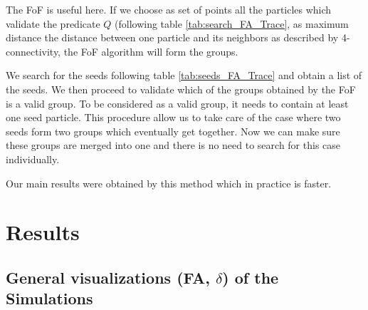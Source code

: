 \documentclass[12pt]{article}
\begin{document}
\begin{par}
The FoF is useful here. If we choose as set of points all the
particles which validate the predicate $Q$ (following table
\ref{tab:search_FA_Trace}, as maximum distance the distance
between one particle and its neighbors as described by
4-connectivity, the FoF algorithm will form the groups. 
\end{par}
\begin{par}
We search for the seeds following table \ref{tab:seeds_FA_Trace}
and obtain a list of the seeds. We then proceed to validate which
of the groups obtained by the FoF is a valid group. To be
considered as a valid group, it needs to contain at least one seed
particle. This procedure allow us to take care of the case where
two seeds form two groups which eventually get together. Now we
can make sure these groups are merged into one and there is no
need to search for this case individually.
\end{par}

\begin{par}
Our main results were obtained by this method which in practice is faster.
\end{par}





\section{Results}

\subsection{General visualizations (FA, $\delta$) of the Simulations}
\end{document}
